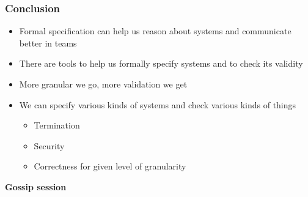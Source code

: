 \documentclass{beamer}
\begin{document}
\begin{frame}
    \frametitle{Conclusion}
    \begin{itemize}
        \item Formal specification can help us reason about systems and communicate better in teams
        \item There are tools to help us formally specify systems and to check its validity 
        \item More granular we go, more validation we get
        \item We can specify various kinds of systems and check various kinds of things
        \begin{itemize}
            \item Termination
            \item Security
            \item Correctness for given level of granularity
        \end{itemize}
    \end{itemize}
\end{frame}

\begin{frame}
    \begin{center}
        \LARGE{\textbf{Gossip session}}
    \end{center}

\end{frame}
\end{document}
